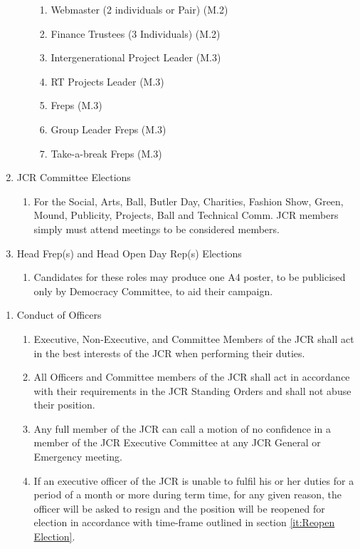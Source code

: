 \begin{enumerate}
\begin{enumerate}
\begin{enumerate}
            \item Webmaster (2 individuals or Pair) (M.2)
            \item Finance Trustees (3 Individuals) (M.2)
            \item Intergenerational Project Leader (M.3)
            \item RT Projects Leader (M.3)
            \item Freps (M.3)
            \item Group Leader Freps (M.3)
            \item Take-a-break Freps (M.3)
        \end{enumerate}
    \end{enumerate}
    \item JCR Committee Elections
    \begin{enumerate}
        \item For the Social, Arts, Ball, Butler Day, Charities, Fashion Show, Green, Mound, Publicity, Projects, Ball and Technical Comm. JCR members simply must attend meetings to be considered members.
    \end{enumerate}
    \item Head Frep(s) and Head Open Day Rep(s) Elections
    \begin{enumerate}
        \item Candidates for these roles may produce one A4 poster, to be publicised only by Democracy Committee, to aid their campaign.
    \end{enumerate}
\end{enumerate}

\begin{enumerate}
    \item Conduct of Officers
    \begin{enumerate}
        \item Executive, Non-Executive, and Committee Members of the JCR shall act in the best interests of the JCR when performing their duties.
        \item All Officers and Committee members of the JCR shall act in accordance with their requirements in the JCR Standing Orders and shall not abuse their position.
        \item Any full member of the JCR can call a motion of no confidence in a member of the JCR Executive Committee at any JCR General or Emergency meeting.
        \item If an executive officer of the JCR is unable to fulfil his or her duties for a period of a month or more during term time, for any given reason, the officer will be asked to resign and the position will be reopened for election in accordance with time-frame outlined in section \ref{it:Reopen Election}.
    \end{enumerate}
\end{enumerate}

